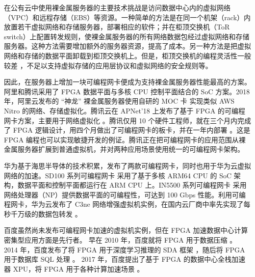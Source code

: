在公有云中使用裸金属服务器的主要技术挑战是访问数据中心内的虚拟网络（VPC）和远程存储（EBS）等资源。一种简单的方法是在同一个机架（rack）内放置若干虚拟网络和存储服务器，部署相应的软件；并在柜顶交换机（ToR switch）上配置转发规则，使裸金属服务器的所有网络数据包经过虚拟网络和存储服务器。这种方法需要增加额外的服务器资源，提高了成本。另一种方法是把虚拟网络和存储的数据平面卸载到柜顶交换机上。但是，柜顶交换机的编程灵活性一般较差 \cite{tencent-smartnic}，不足以支持虚拟存储的应用层协议和虚拟网络的安全规则等。

因此，在服务器上增加一块可编程网卡便成为支持裸金属服务器性能最高的方案。阿里和腾讯采用了 FPGA 数据平面与多核 CPU 控制平面结合的 SoC 方案。2018 年，阿里云发布的 ``神龙'' 裸金属服务器使用自研的 MOC 卡 \cite{alicloud-smartnic,alicloud-xdragon} 实现类似 AWS Nitro 的网络、存储虚拟化。腾讯云在 APNet’18 上发布了基于 FPGA 的可编程网卡方案，主要用于网络虚拟化 \cite{tencent-smartnic}。腾讯仅用 10 个硬件工程师，就在三个月内完成了 FPGA 逻辑设计，用四个月做出了可编程网卡的板卡，并在一年内部署 \cite{tencent-smartnic}。这是 FPGA 编程也可以实现敏捷开发的例证。腾讯正在把可编程网卡的应用范围从裸金属服务器扩展到普通虚拟机，并对两种应用场景使用统一的可编程网卡架构。

华为基于海思半导体的技术积累，发布了两款可编程网卡，同时也用于华为云虚拟网络的加速。SD100 系列可编程网卡 \cite{sd100} 采用了基于多核 ARM64 CPU 的 SoC 架构，数据平面和控制平面都运行在 ARM CPU 上。IN5500 系列可编程网卡 \cite{in200} 采用网络处理器（NP）提供数据平面的可编程性，可达到 100 Gbps 性能。利用可编程网卡，华为云发布了 C3ne 网络增强虚拟机实例，在国内云厂商中率先实现了每秒千万级的数据包转发 \cite{huawei-smartnic}。

百度虽然尚未发布可编程网卡加速的虚拟机实例，但在 FPGA 加速数据中心计算密集型应用方面是先行者。
早在 2010 年，百度就将 FPGA 用于数据压缩 \cite{ouyang2010fpga}。
2014 年，百度发布了将 FPGA 用于深度学习推理的 SDA 框架 \cite{ouyang2014sda}，随后将 FPGA 用于数据库 SQL 处理 \cite{baidu-fpga-sql}。
2017 年，百度提出了基于 FPGA 的数据中心全栈加速器 XPU，将 FPGA 用于各种计算加速场景 \cite{ouyang2017xpu}。